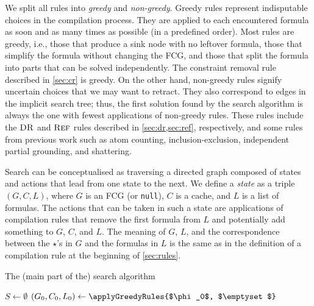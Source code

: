 We split all rules into \emph{greedy} and \emph{non-greedy}. Greedy rules represent indisputable choices in the compilation process. They are applied to each encountered formula as soon and as many times as possible (in a predefined order). Most rules are greedy, i.e., those that produce a sink node with no leftover formula, those that simplify the formula without changing the FCG, and those that split the formula into parts that can be solved independently. The constraint removal rule described in \cref{sec:cr} is greedy. On the other hand, non-greedy rules signify uncertain choices that we may want to retract. They also correspond to edges in the implicit search tree; thus, the first solution found by the search algorithm is always the one with fewest applications of non-greedy rules. These rules include the $\operatorname{\textsc{DR}}$ and $\operatorname{\textsc{Ref}}$ rules described in \cref{sec:dr,sec:ref}, respectively, and some rules from previous work \citep{DBLP:conf/ijcai/BroeckTMDR11} such as atom counting, inclusion-exclusion, independent partial grounding, and shattering.

Search can be conceptualised as traversing a directed graph composed of states and actions that lead from one state to the next. We define a \emph{state} as a triple $(G, C, L)$, where $G$ is an FCG (or \texttt{null}), $C$ is a cache, and $L$ is a list of formulas. The actions that can be taken in such a state are applications of compilation rules that remove the first formula from $L$ and potentially add something to $G$, $C$, and $L$. The meaning of $G$, $L$, and the correspondence between the $\star$'s in $G$ and the formulas in $L$ is the same as in the definition of a compilation rule at the beginning of \cref{sec:rules}.

\begin{algorithm}
  \caption{The (main part of the) search algorithm}
  \label{alg:search}
  $S \gets \emptyset$\;
  $(G_0, C_0, L_0) \gets \applyGreedyRules{$\phi_0$, $\emptyset$}$\;\label{line:greedy}
\end{algorithm}

